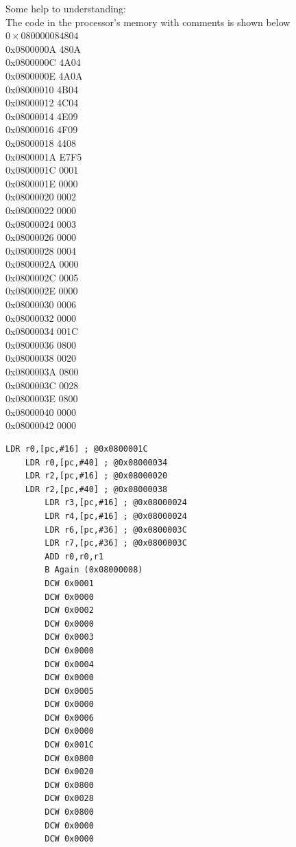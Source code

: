 \documentclass[10pt]{article}
\begin{document}
Some help to understanding:\\
The code in the processor's memory with comments is shown below\\
$0 \times 080000084804$\\
0x0800000A 480A\\
0x0800000C 4A04\\
0x0800000E 4A0A\\
0x08000010 4B04\\
0x08000012 4C04\\
0x08000014 4E09\\
0x08000016 4F09\\
0x08000018 4408\\
0x0800001A E7F5\\
0x0800001C 0001\\
0x0800001E 0000\\
0x08000020 0002\\
0x08000022 0000\\
0x08000024 0003\\
0x08000026 0000\\
0x08000028 0004\\
0x0800002A 0000\\
0x0800002C 0005\\
0x0800002E 0000\\
0x08000030 0006\\
0x08000032 0000\\
0x08000034 001C\\
0x08000036 0800\\
0x08000038 0020\\
0x0800003A 0800\\
0x0800003C 0028\\
0x0800003E 0800\\
0x08000040 0000\\
0x08000042 0000

\begin{verbatim}
LDR r0,[pc,#16] ; @0x0800001C
    LDR r0,[pc,#40] ; @0x08000034
    LDR r2,[pc,#16] ; @0x08000020
    LDR r2,[pc,#40] ; @0x08000038
        LDR r3,[pc,#16] ; @0x08000024
        LDR r4,[pc,#16] ; @0x08000024
        LDR r6,[pc,#36] ; @0x0800003C
        LDR r7,[pc,#36] ; @0x0800003C
        ADD r0,r0,r1
        B Again (0x08000008)
        DCW 0x0001
        DCW 0x0000
        DCW 0x0002
        DCW 0x0000
        DCW 0x0003
        DCW 0x0000
        DCW 0x0004
        DCW 0x0000
        DCW 0x0005
        DCW 0x0000
        DCW 0x0006
        DCW 0x0000
        DCW 0x001C
        DCW 0x0800
        DCW 0x0020
        DCW 0x0800
        DCW 0x0028
        DCW 0x0800
        DCW 0x0000
        DCW 0x0000
\end{verbatim}
\end{document}
